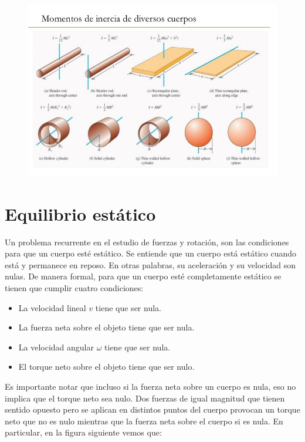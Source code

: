 \documentclass[letterpaper]{article}
\begin{document}
\begin{figure}[h]
\centering
\includegraphics[scale=0.4]{momentos_de_inercia.jpg}
\end{figure}

\section*{Equilibrio estático}

Un problema recurrente en el estudio de fuerzas y rotación, son las condiciones para que un cuerpo esté estático. Se entiende que un cuerpo está estático cuando está y permanece en reposo. En otras palabras, su aceleración y su velocidad son nulas. De manera formal, para que un cuerpo esté completamente estático se tienen que cumplir cuatro condiciones:
\begin{itemize}
\item La velocidad lineal $v$ tiene que ser nula.
\item La fuerza neta sobre el objeto tiene que ser nula.
\item La velocidad angular $\omega$ tiene que ser nula.
\item El torque neto sobre el objeto tiene que ser nulo.
\end{itemize}

Es importante notar que incluso si la fuerza neta sobre un cuerpo es nula, eso no implica que el torque neto sea nulo. Dos fuerzas de igual magnitud que tienen sentido opuesto pero se aplican en distintos puntos del cuerpo provocan un torque neto que no es nulo mientras que la fuerza neta sobre el cuerpo si es nula. En particular, en la figura siguiente vemos que:
\end{document}
